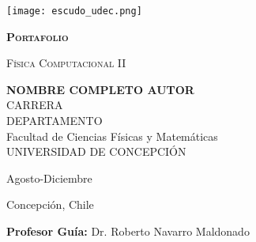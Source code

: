 \documentclass[../portafolio.tex]{subfiles}
\begin{document}


\begin{titlepage}
  
  
  \thispagestyle{frontpage}
  
  \begin{center}
    
    \texttt{[image: escudo\_udec.png]}
    
    
    \vspace*{3\baselineskip}

      \textsc{\Huge \textbf{Portafolio}}
      \vspace*{1.5\baselineskip}
      
      \textsc{\huge Física Computacional II}\\ %
      
      \vspace*{4\baselineskip}
      
      \large{\textbf{NOMBRE COMPLETO AUTOR}}\\ 
      
      \large{CARRERA \\
        DEPARTAMENTO \\
        Facultad de Ciencias Físicas y Matemáticas\\
        UNIVERSIDAD DE CONCEPCIÓN}
      
    
    \vspace{4\baselineskip}

    Agosto-Diciembre \the\year

    \vspace{0.1\baselineskip}

    Concepción, Chile 

    \vspace{1.5\baselineskip}
    
    \large{\textbf{Profesor Guía:} Dr. Roberto Navarro Maldonado}\\
    
  \end{center}
  
  \vspace*{4\baselineskip}
  
  
\end{titlepage}
\end{document}
